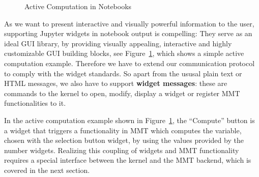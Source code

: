 \begin{figure}[ht]\centering
  \caption{Active Computation in Notebooks}\label{fig:active-computation}
\end{figure}

As we want to present interactive and visually powerful information to the user, supporting Jupyter widgets in notebook output is compelling:
They serve as an ideal GUI library, by providing visually appealing, interactive and highly customizable GUI building blocks, see Figure~\ref{fig:active-computation}, which shows a simple active computation example.
Therefore we have to extend our communication protocol to comply with the widget standards. So apart from the ususal plain text or HTML messages, we also have to support \textbf{widget messages}: these are commands to the kernel to open, modify, display a widget or register MMT functionalities to it.

In the active computation example shown in Figure~\ref{fig:active-computation}, the ``Compute'' button is a widget that triggers a functionality in MMT which computes the variable, chosen with the selection button widget, by using the values provided by the number widgets. Realizing this coupling of widgets and MMT functionality requires a special interface between the kernel and the MMT backend, which is covered in the next section.



